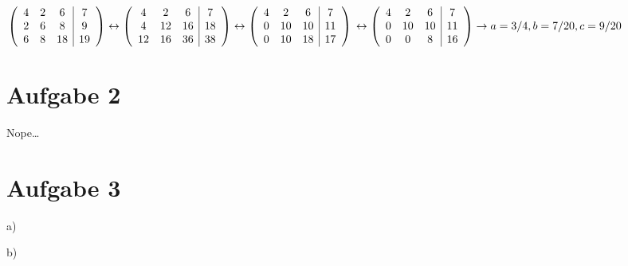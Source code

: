 \documentclass[10pt,a4paper]{article}
\begin{document}
$
\left(
\begin{array}{ccc | c}
    4 & 2 & 6 & 7\\
    2 & 6 & 8 & 9\\
    6 & 8 & 18 & 19
\end{array}
\right) \leftrightarrow
\left(
\begin{array}{ccc | c}
    4 & 2 & 6 & 7\\
    4 & 12 & 16 & 18\\
    12 & 16 & 36 & 38
\end{array}
\right)  \leftrightarrow
\left(
\begin{array}{ccc | c}
    4 & 2 & 6 & 7\\
    0 & 10 & 10 & 11\\
    0 & 10 & 18 & 17
\end{array}
\right)  
\\\leftrightarrow
\left(
\begin{array}{ccc | c}
    4 & 2 & 6 & 7\\
    0 & 10 & 10 & 11\\
    0 & 0 & 8 & 16
\end{array}
\right) \rightarrow a = 3/4, b = 7/20, c = 9/20\\
$

\section*{Aufgabe 2}
Nope\ldots

\section*{Aufgabe 3}
a)

b)

\end{document}

